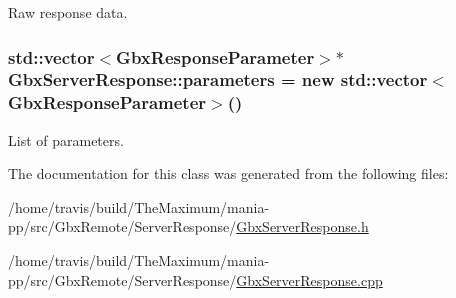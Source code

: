 Raw response data. 

\hypertarget{classGbxServerResponse_ad6fef5319c4da9461f4cd0d72d8b5ee8}{
\subsubsection[{parameters}]{\setlength{\rightskip}{0pt plus 5cm}std\-::vector$<${\bf Gbx\-Response\-Parameter}$>$$\ast$ Gbx\-Server\-Response\-::parameters = new std\-::vector$<${\bf Gbx\-Response\-Parameter}$>$()\hspace{0.3cm}{\ttfamily [protected]}}}\label{classGbxServerResponse_ad6fef5319c4da9461f4cd0d72d8b5ee8}


List of parameters. 



The documentation for this class was generated from the following files\-:\begin{DoxyCompactItemize}
\item 
/home/travis/build/\-The\-Maximum/mania-\/pp/src/\-Gbx\-Remote/\-Server\-Response/\hyperlink{GbxServerResponse_8h}{Gbx\-Server\-Response.\-h}\item 
/home/travis/build/\-The\-Maximum/mania-\/pp/src/\-Gbx\-Remote/\-Server\-Response/\hyperlink{GbxServerResponse_8cpp}{Gbx\-Server\-Response.\-cpp}\end{DoxyCompactItemize}
